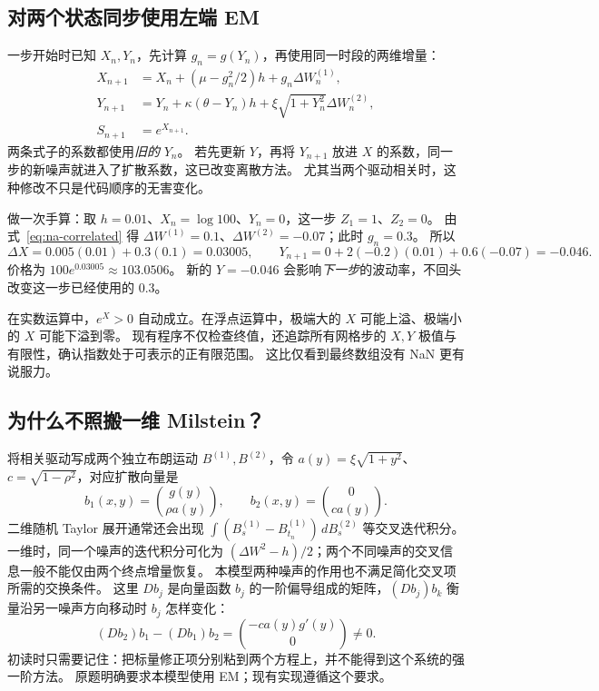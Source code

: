 \documentclass[11pt,a4paper,fontset=none]{ctexart}
\numberwithin{equation}{section}
\begin{document}
\subsection{对两个状态同步使用左端 EM}
一步开始时已知 $X_n,Y_n$，先计算 $g_n=g(Y_n)$，再使用同一时段的两维增量：
\begin{align}
 X_{n+1}&=X_n+(\mu-g_n^2/2)h+g_n\Delta W_n^{(1)},\label{eq:na-em-x}\\
 Y_{n+1}&=Y_n+\kappa(\theta-Y_n)h+\xi\sqrt{1+Y_n^2}\Delta W_n^{(2)},\label{eq:na-em-y}\\
 S_{n+1}&=e^{X_{n+1}}.\label{eq:na-em-s}
\end{align}
两条式子的系数都使用\emph{旧的} $Y_n$。
若先更新 $Y$，再将 $Y_{n+1}$ 放进 $X$ 的系数，同一步的新噪声就进入了扩散系数，这已改变离散方法。
尤其当两个驱动相关时，这种修改不只是代码顺序的无害变化。

做一次手算：取 $h=0.01$、$X_n=\log100$、$Y_n=0$，这一步 $Z_1=1$、$Z_2=0$。
由式~\eqref{eq:na-correlated} 得 $\Delta W^{(1)}=0.1$、$\Delta W^{(2)}=-0.07$；此时 $g_n=0.3$。
所以
\begin{equation}\label{eq:na-hand-step}
 \Delta X=0.005(0.01)+0.3(0.1)=0.03005,\qquad
 Y_{n+1}=0+2(-0.2)(0.01)+0.6(-0.07)=-0.046.
\end{equation}
价格为 $100e^{0.03005}\approx103.0506$。
新的 $Y=-0.046$ 会影响\emph{下一步}的波动率，不回头改变这一步已经使用的 $0.3$。

在实数运算中，$e^X>0$ 自动成立。在浮点运算中，极端大的 $X$ 可能上溢、极端小的 $X$ 可能下溢到零。
现有程序不仅检查终值，还追踪所有网格步的 $X,Y$ 极值与有限性，确认指数处于可表示的正有限范围。
这比仅看到最终数组没有 NaN 更有说服力。

\subsection{为什么不照搬一维 Milstein？}
将相关驱动写成两个独立布朗运动 $B^{(1)},B^{(2)}$，令 $a(y)=\xi\sqrt{1+y^2}$、$c=\sqrt{1-\rho^2}$，对应扩散向量是
\begin{equation}\label{eq:na-diffusion-columns}
 b_1(x,y)=\binom{g(y)}{\rho a(y)},\qquad b_2(x,y)=\binom{0}{ca(y)}.
\end{equation}
二维随机 Taylor 展开通常还会出现 $\int(B^{(1)}_s-B^{(1)}_{t_n})\,dB_s^{(2)}$ 等交叉迭代积分。
一维时，同一个噪声的迭代积分可化为 $(\Delta W^2-h)/2$；两个不同噪声的交叉信息一般不能仅由两个终点增量恢复。
本模型两种噪声的作用也不满足简化交叉项所需的交换条件。
这里 $Db_j$ 是向量函数 $b_j$ 的一阶偏导组成的矩阵，$(Db_j)b_k$ 衡量沿另一噪声方向移动时 $b_j$ 怎样变化：
\begin{equation}\label{eq:na-noncommute}
 (Db_2)b_1-(Db_1)b_2=\binom{-ca(y)g'(y)}0\ne0.
\end{equation}
初读时只需要记住：把标量修正项分别粘到两个方程上，并不能得到这个系统的强一阶方法。
原题明确要求本模型使用 EM；现有实现遵循这个要求。
\end{document}
